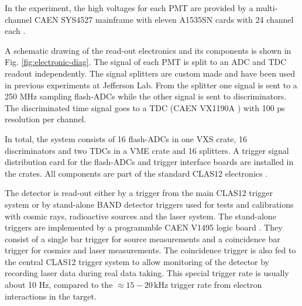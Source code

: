 \documentclass[3p,final,twocolumn]{elsarticle}
\begin{document}
In the experiment, the high voltages for each PMT are provided by a multi-channel CAEN SYS4527 mainframe with eleven A1535SN cards with 24 channel each \cite{caen-hvframe,caen-hvcard}.

A schematic drawing of the read-out electronics and its components is
shown in Fig. \ref{fig:electronic-diag}. The signal of each PMT is
split to an ADC and TDC readout independently.  The signal splitters
are custom made and have been used in previous experiments at
Jefferson Lab.  From the splitter one signal is sent to a 250
\si{\mega\hertz} sampling flash-ADCs \cite{fadc-manual} while the
other signal is sent to discriminators.  The discriminated time signal
goes to a TDC (CAEN VX1190A \cite{caen-tdc}) with 100 ps resolution
per channel.


In total, the system consists of 16 flash-ADCs in one VXS crate, 16
discriminators and two TDCs in a VME crate and 16 splitters.
A trigger signal distribution card for the flash-ADCs and
trigger interface boards are installed in the crates. All components
are part of the standard CLAS12 electronics \cite{clas12-daq, clas12-trigger}.

The detector is read-out either by a trigger from the main CLAS12
trigger system \cite{clas12-trigger} or by stand-alone BAND detector
triggers used for tests and calibrations with cosmic rays, radioactive
sources and the laser system. The stand-alone triggers are implemented
by a programmble CAEN V1495 logic board \cite{caen-logicboard}. They
consist of a single bar trigger for source measurements and a
coincidence bar trigger for cosmics and laser measurements. The
coincidence trigger is also fed to the central CLAS12 trigger system
to allow monitoring of the detector by recording laser data during
real data taking. This special trigger rate is usually about 10
\si{\hertz}, compared to the $\approx 15-20\,\si{\kilo\hertz}$ trigger
rate from electron interactions in the target.




\end{document}
